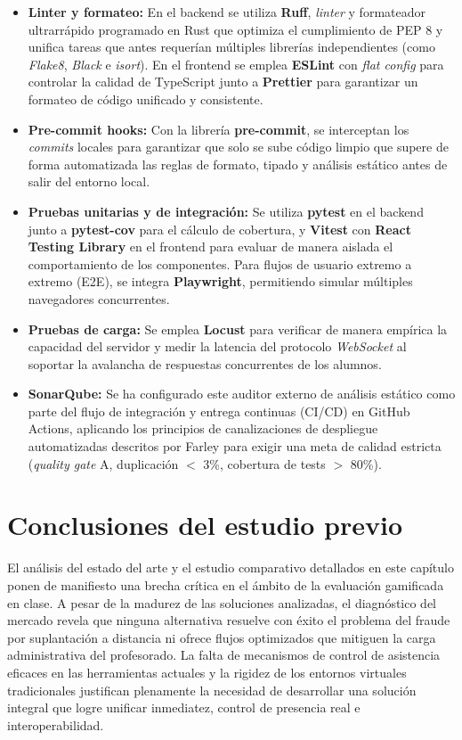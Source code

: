 \begin{itemize}
    \item \textbf{Linter y formateo:} En el backend se utiliza \textbf{Ruff}, \textit{linter} y formateador ultrarrápido programado en Rust que optimiza el cumplimiento de PEP 8 y unifica tareas que antes requerían múltiples librerías independientes (como \textit{Flake8}, \textit{Black} e \textit{isort}). En el frontend se emplea \textbf{ESLint} con \textit{flat config} para controlar la calidad de TypeScript junto a \textbf{Prettier} para garantizar un formateo de código unificado y consistente.
    \item \textbf{Pre-commit hooks:} Con la librería \textbf{pre-commit}, se interceptan los \textit{commits} locales para garantizar que solo se sube código limpio que supere de forma automatizada las reglas de formato, tipado y análisis estático antes de salir del entorno local.
    \item \textbf{Pruebas unitarias y de integración:} Se utiliza \textbf{pytest} en el backend junto a \textbf{pytest-cov} para el cálculo de cobertura, y \textbf{Vitest} con \textbf{React Testing Library} en el frontend para evaluar de manera aislada el comportamiento de los componentes. Para flujos de usuario extremo a extremo (E2E), se integra \textbf{Playwright}, permitiendo simular múltiples navegadores concurrentes.
    \item \textbf{Pruebas de carga:} Se emplea \textbf{Locust} para verificar de manera empírica la capacidad del servidor y medir la latencia del protocolo \textit{WebSocket} al soportar la avalancha de respuestas concurrentes de los alumnos.
    \item \textbf{SonarQube:} Se ha configurado este auditor externo de análisis estático como parte del flujo de integración y entrega continuas (CI/CD) en GitHub Actions, aplicando los principios de canalizaciones de despliegue automatizadas descritos por Farley \cite{farley2021continuous} para exigir una meta de calidad estricta (\textit{quality gate} A, duplicación $<$ 3\%, cobertura de tests $>$ 80\%).
\end{itemize}

\section{Conclusiones del estudio previo}\label{sec:conclusiones_estudio_previo}

El análisis del estado del arte y el estudio comparativo detallados en este capítulo ponen de manifiesto una brecha crítica en el ámbito de la evaluación gamificada en clase. A pesar de la madurez de las soluciones analizadas, el diagnóstico del mercado revela que ninguna alternativa resuelve con éxito el problema del fraude por suplantación a distancia ni ofrece flujos optimizados que mitiguen la carga administrativa del profesorado. La falta de mecanismos de control de asistencia eficaces en las herramientas actuales y la rigidez de los entornos virtuales tradicionales justifican plenamente la necesidad de desarrollar una solución integral que logre unificar inmediatez, control de presencia real e interoperabilidad.

